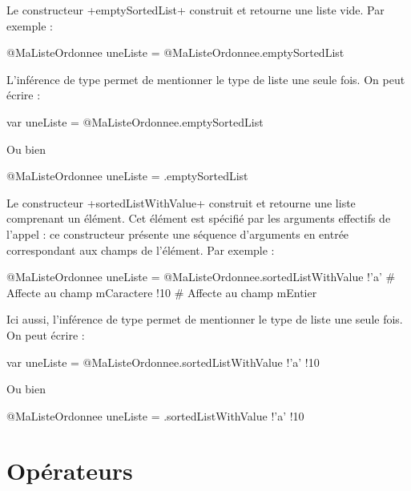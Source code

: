 
Le constructeur \ggst+emptySortedList+ construit et retourne une liste vide. Par exemple :
\begin{galgas3}
@MaListeOrdonnee uneListe = @MaListeOrdonnee.emptySortedList
\end{galgas3}

L'inférence de type permet de mentionner le type de liste une seule fois. On peut écrire :
\begin{galgas3}
var uneListe = @MaListeOrdonnee.emptySortedList
\end{galgas3}

Ou bien
\begin{galgas3}
@MaListeOrdonnee uneListe = .emptySortedList
\end{galgas3}



Le constructeur \ggst+sortedListWithValue+ construit et retourne une liste comprenant un élément. Cet élément est spécifié par les arguments effectifs de l'appel : ce constructeur présente une séquence d'arguments en entrée correspondant aux champs de l'élément. Par exemple :

\begin{galgas3}
@MaListeOrdonnee uneListe = @MaListeOrdonnee.sortedListWithValue {
  !'a' # Affecte au champ mCaractere
  !10  # Affecte au champ mEntier
}
\end{galgas3}

Ici aussi, l'inférence de type permet de mentionner le type de liste une seule fois. On peut écrire :
\begin{galgas3}
var uneListe = @MaListeOrdonnee.sortedListWithValue {!'a' !10}

\end{galgas3}

Ou bien
\begin{galgas3}
@MaListeOrdonnee uneListe = .sortedListWithValue {!'a' !10}
\end{galgas3}









\section{Opérateurs}







